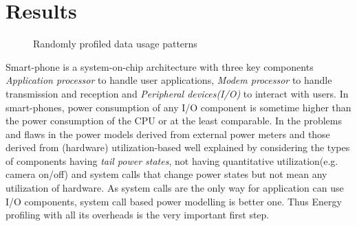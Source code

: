 \chapter{Results}
\begin{figure}[t]
 \begin{center}
 \end{center}
 \caption{Randomly profiled data usage patterns}
 \label{fig:TrepnDataUsage}
\end{figure} 
Smart-phone is a system-on-chip architecture with three key components  \emph{Application processor} to handle user applications, \emph{Modem processor} to handle transmission and reception and \emph{Peripheral devices(I/O)} to interact with users. In smart-phones, power consumption of any I/O component is sometime higher than the power consumption of the CPU or at the least comparable. In \cite{EModel} the problems and flaws in the power models derived from external power meters and those derived from (hardware) utilization-based well explained by considering the types of components having \textit{tail power states},  not having quantitative utilization(e.g. camera on/off) and system calls that change power states but not mean any utilization of hardware. As system calls are the only way for application can use I/O components, system call based power modelling is better one. Thus Energy profiling with all its overheads is the very important first step.
